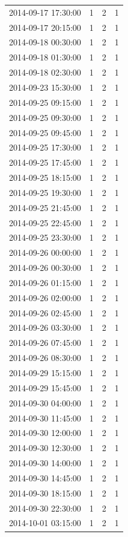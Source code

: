 \begin{tabular}{lrrr}
2014-09-17 17:30:00 & 1 & 2 & 1 \\
2014-09-17 20:15:00 & 1 & 2 & 1 \\
2014-09-18 00:30:00 & 1 & 2 & 1 \\
2014-09-18 01:30:00 & 1 & 2 & 1 \\
2014-09-18 02:30:00 & 1 & 2 & 1 \\
2014-09-23 15:30:00 & 1 & 2 & 1 \\
2014-09-25 09:15:00 & 1 & 2 & 1 \\
2014-09-25 09:30:00 & 1 & 2 & 1 \\
2014-09-25 09:45:00 & 1 & 2 & 1 \\
2014-09-25 17:30:00 & 1 & 2 & 1 \\
2014-09-25 17:45:00 & 1 & 2 & 1 \\
2014-09-25 18:15:00 & 1 & 2 & 1 \\
2014-09-25 19:30:00 & 1 & 2 & 1 \\
2014-09-25 21:45:00 & 1 & 2 & 1 \\
2014-09-25 22:45:00 & 1 & 2 & 1 \\
2014-09-25 23:30:00 & 1 & 2 & 1 \\
2014-09-26 00:00:00 & 1 & 2 & 1 \\
2014-09-26 00:30:00 & 1 & 2 & 1 \\
2014-09-26 01:15:00 & 1 & 2 & 1 \\
2014-09-26 02:00:00 & 1 & 2 & 1 \\
2014-09-26 02:45:00 & 1 & 2 & 1 \\
2014-09-26 03:30:00 & 1 & 2 & 1 \\
2014-09-26 07:45:00 & 1 & 2 & 1 \\
2014-09-26 08:30:00 & 1 & 2 & 1 \\
2014-09-29 15:15:00 & 1 & 2 & 1 \\
2014-09-29 15:45:00 & 1 & 2 & 1 \\
2014-09-30 04:00:00 & 1 & 2 & 1 \\
2014-09-30 11:45:00 & 1 & 2 & 1 \\
2014-09-30 12:00:00 & 1 & 2 & 1 \\
2014-09-30 12:30:00 & 1 & 2 & 1 \\
2014-09-30 14:00:00 & 1 & 2 & 1 \\
2014-09-30 14:45:00 & 1 & 2 & 1 \\
2014-09-30 18:15:00 & 1 & 2 & 1 \\
2014-09-30 22:30:00 & 1 & 2 & 1 \\
2014-10-01 03:15:00 & 1 & 2 & 1 \\

\end{tabular}
